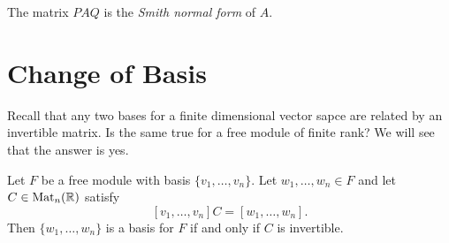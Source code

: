 \begin{definition}
  The matrix $PAQ$ is the \emph{Smith normal form}
  of $A$.
\end{definition}

\section{Change of Basis}
\begin{remark}
  Recall that any two bases for a finite dimensional
  vector sapce are related by an invertible matrix. Is
  the same true for a free module of finite rank?
  We will see that the answer is yes.
\end{remark}

\begin{lemma}
  Let $F$ be a free module with basis
  $\{v_1, \dots, v_n\}$. Let $w_1, \dots, w_n \in F$ and
  let $C \in \operatorname{Mat}_n(\mathbb{R})$ satisfy
  \[
    [v_1, \dots, v_n] C = [w_1, \dots, w_n]. \tag{$*$}
  \]
  Then $\{w_1, \dots, w_n\}$ is a basis for $F$ if and
  only if $C$ is invertible.
\end{lemma}

